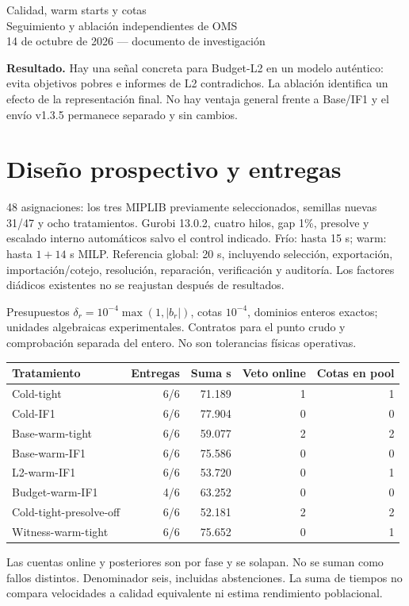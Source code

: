 \documentclass[10pt,a4paper]{article}
\begin{document}
\begin{center}{\Large Calidad, warm starts y cotas}\\[4pt]
{\large Seguimiento y ablación independientes de OMS}\\[3pt]
14 de octubre de 2026 --- documento de investigación\end{center}
\textbf{Resultado.} Hay una señal concreta para Budget-L2 en un modelo auténtico:
evita objetivos pobres e informes de L2 contradichos. La ablación identifica un
efecto de la representación final. No hay ventaja general frente a Base/IF1 y
el envío v1.3.5 permanece separado y sin cambios.
\section*{Diseño prospectivo y entregas}
48 asignaciones: los tres MIPLIB previamente seleccionados, semillas nuevas
31/47 y ocho tratamientos. Gurobi 13.0.2, cuatro hilos, gap 1\%, presolve y
escalado interno automáticos salvo el control indicado. Frío: hasta 15 s;
warm: hasta $1+14$ s MILP. Referencia global: 20 s, incluyendo selección,
exportación, importación/cotejo, resolución, reparación, verificación y auditoría.
Los factores diádicos existentes no se reajustan después de resultados.

Presupuestos $\delta_r=10^{-4}\max(1,|b_r|)$, cotas $10^{-4}$, dominios
enteros exactos; unidades algebraicas experimentales. Contratos para el punto
crudo y comprobación separada del entero. No son tolerancias físicas operativas.
\begin{center}\small\begin{tabular}{@{}lrrrr@{}}\toprule
Tratamiento & Entregas & Suma s & Veto online & Cotas en pool\\\midrule
Cold-tight & 6/6 & 71.189 & 1 & 1\\
Cold-IF1 & 6/6 & 77.904 & 0 & 0\\
Base-warm-tight & 6/6 & 59.077 & 2 & 2\\
Base-warm-IF1 & 6/6 & 75.586 & 0 & 0\\
L2-warm-IF1 & 6/6 & 53.720 & 0 & 1\\
Budget-warm-IF1 & 4/6 & 63.252 & 0 & 0\\
Cold-tight-presolve-off & 6/6 & 52.181 & 2 & 2\\
Witness-warm-tight & 6/6 & 75.652 & 0 & 1\\
\bottomrule\end{tabular}\end{center}
Las cuentas online y posteriores son por fase y se solapan. No se suman como
fallos distintos. Denominador seis, incluidas abstenciones. La suma de tiempos
no compara velocidades a calidad equivalente ni estima rendimiento poblacional.
\end{document}

